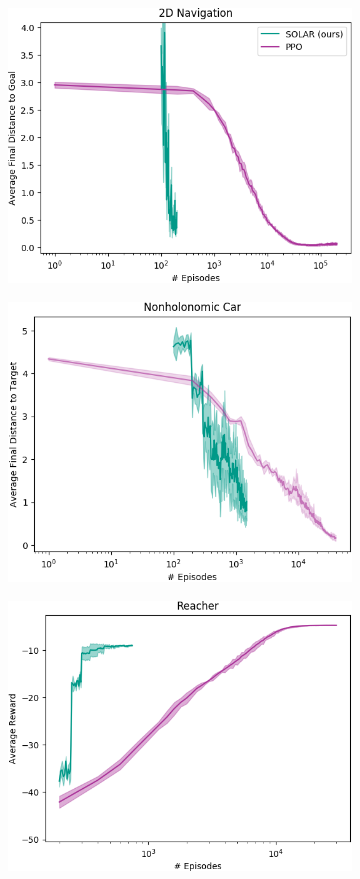 \begin{figure}
    \centering
    \begin{subfigure}{0.32\linewidth}
        \includegraphics[width=0.9\linewidth]{img/solar/2dnav-log.png}
        \caption{}
    \end{subfigure}
    \begin{subfigure}{0.31\linewidth}
        \includegraphics[width=0.9\linewidth]{img/solar/car-log.png}
        \caption{}
    \end{subfigure}
    \begin{subfigure}{0.33\linewidth}
        \includegraphics[width=0.9\linewidth]{img/solar/reacher-log.png}

\end{subfigure}
\end{figure}
